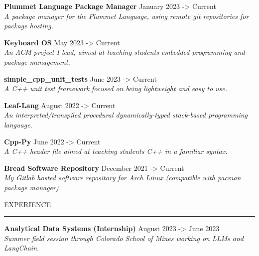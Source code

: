 \documentclass[10pt,letterpaper]{article}
\newcommand{\customtext}[2]{%
    {\fontsize{#1}{\dimexpr #1pt+2pt}\selectfont #2}%
}
\begin{document}
\begin{flushleft}
    {\customtext{12}{\textbf{Plummet Language Package Manager}} \hfill \customtext{12}{January 2023 -> Current}} \\
    \customtext{10}{\textit{A package manager for the Plummet Language, using remote git repositories for package hosting.}}
    \vspace{14pt}

    {\customtext{12}{\textbf{Keyboard OS}} \hfill \customtext{12}{May 2023 -> Current}} \\
    \customtext{10}{\textit{An ACM project I lead, aimed at teaching students embedded programming and package management.}}
    \vspace{14pt}

    {\customtext{12}{\textbf{simple\_cpp\_unit\_tests}} \hfill \customtext{12}{June 2023 -> Current}} \\
    \customtext{10}{\textit{A C++ unit test framework focused on being lightweight and easy to use.}}
    \vspace{14pt}

    {\customtext{12}{\textbf{Leaf-Lang}} \hfill \customtext{12}{August 2022 -> Current}} \\
    \customtext{10}{\textit{An interpreted/transpiled procedural dynamically-typed stack-based programming language.}}
    \vspace{14pt}


    {\customtext{12}{\textbf{Cpp-Py}} \hfill \customtext{12}{June 2022 -> Current}} \\
    \customtext{10}{\textit{A C++ header file aimed at teaching students C++ in a familiar syntax.}}
    \vspace{14pt}


    {\customtext{12}{\textbf{Bread Software Repository}} \hfill \customtext{12}{December 2021 -> Current}} \\
    \customtext{10}{\textit{My Gitlab hosted software repository for Arch Linux (compatible with pacman package manager).}}
    \vspace{14pt}


    \textcolor{headercolor}{\customtext{14}{EXPERIENCE}}
    \textcolor{gray}{\rule{\textwidth}{2pt}}

    {\customtext{12}{\textbf{Analytical Data Systems (Internship)}} \hfill \customtext{12}{August 2023 -> June 2023}} \\
    \customtext{10}{\textit{Summer field session through Colorado School of Mines working on LLMs and LangChain.}}
    \vspace{14pt}


\end{flushleft}
\end{document}
